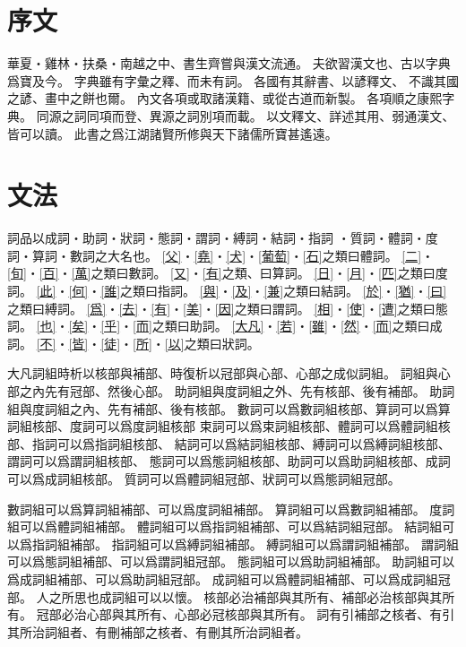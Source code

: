 \chapter*{序文}
華夏・雞林・扶桑・南越之中、書生齊嘗與漢文流通。
夫欲習漢文也、古以字典爲寶及今。
字典雖有字彙之釋、而未有詞。
各國有其辭書、以諺釋文、
不識其國之諺、畫中之餅也爾。
內文各項或取諸漢籍、或從古道而新製。
各項順之康熙字典。
同源之詞同項而登、異源之詞別項而載。
以文釋文、詳述其用、弱通漢文、皆可以讀。
此書之爲江湖諸賢所修與天下諸儒所寶甚遙遠。
\chapter*{文法}
詞品以成詞・助詞・狀詞・態詞・謂詞・縛詞・結詞・指詞
・質詞・體詞・度詞・算詞・數詞之大名也。
\cref{父}・\cref{堯}・\cref{犬}・\cref{葡萄}・\cref{石}之類曰體詞。
\cref{二}・\cref{旬}・\cref{百}・\cref{萬}之類曰數詞。
\cref{又}・\cref{有}之類、曰算詞。
\cref{日}・\cref{月}・\cref{匹}之類曰度詞。
\cref{此}・\cref{何}・\cref{誰}之類曰指詞。
\cref{與}・\cref{及}・\cref{兼}之類曰結詞。
\cref{於}・\cref{猶}・\cref{曰}之類曰縛詞。
\cref{爲}・\cref{去}・\cref{有}・\cref{美}・\cref{因}之類曰謂詞。
\cref{相}・\cref{使}・\cref{遭}之類曰態詞。
\cref{也}・\cref{矣}・\cref{乎}・\cref{而}之類曰助詞。
\cref{大凡}・\cref{若}・\cref{雖}・\cref{然}・\cref{而}之類曰成詞。
\cref{不}・\cref{皆}・\cref{徒}・\cref{所}・\cref{以}之類曰狀詞。

大凡詞組時析以核部與補部、時復析以冠部與心部、心部之成似詞組。
詞組與心部之內先有冠部、然後心部。
助詞組與度詞組之外、先有核部、後有補部。
助詞組與度詞組之內、先有補部、後有核部。
數詞可以爲數詞組核部、算詞可以爲算詞組核部、度詞可以爲度詞組核部
束詞可以爲束詞組核部、體詞可以爲體詞組核部、指詞可以爲指詞組核部、
結詞可以爲結詞組核部、縛詞可以爲縛詞組核部、謂詞可以爲謂詞組核部、
態詞可以爲態詞組核部、助詞可以爲助詞組核部、成詞可以爲成詞組核部。
質詞可以爲體詞組冠部、狀詞可以爲態詞組冠部。

數詞組可以爲算詞組補部、可以爲度詞組補部。
算詞組可以爲數詞組補部。
度詞組可以爲體詞組補部。
體詞組可以爲指詞組補部、可以爲結詞組冠部。
結詞組可以爲指詞組補部。
指詞組可以爲縛詞組補部。
縛詞組可以爲謂詞組補部。
謂詞組可以爲態詞組補部、可以爲謂詞組冠部。
態詞組可以爲助詞組補部。
助詞組可以爲成詞組補部、可以爲助詞組冠部。
成詞組可以爲體詞組補部、可以爲成詞組冠部。
人之所思也成詞組可以以懷。
核部必治補部與其所有、補部必治核部與其所有。
冠部必治心部與其所有、心部必冠核部與其所有。
詞有引補部之核者、有引其所治詞組者、有刪補部之核者、有刪其所治詞組者。
